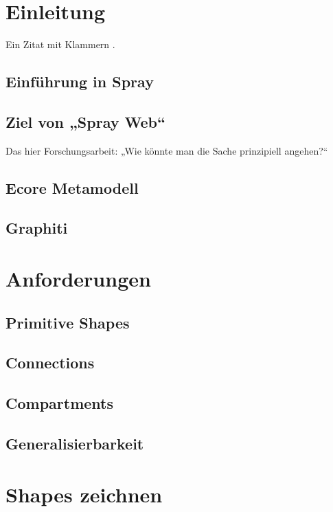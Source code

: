 \section{Einleitung}

Ein Zitat mit Klammern \citep{sprayUser}.

\subsection{Einführung in Spray}

\subsection{Ziel von „Spray Web“}

Das hier Forschungsarbeit: „Wie könnte man die Sache prinzipiell angehen?“

\subsection{Ecore Metamodell}

\subsection{Graphiti}


\section{Anforderungen}

\subsection{Primitive Shapes}

\subsection{Connections}

\subsection{Compartments}

\subsection{Generalisierbarkeit}


\section{Shapes zeichnen}

